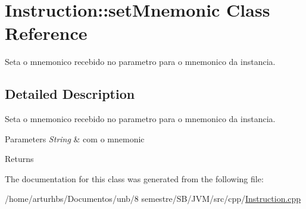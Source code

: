 \hypertarget{classInstruction_1_1setMnemonic}{}\section{Instruction\+:\+:set\+Mnemonic Class Reference}
\label{classInstruction_1_1setMnemonic}


Seta o mnemonico recebido no parametro para o mnemonico da instancia.  




\subsection{Detailed Description}
Seta o mnemonico recebido no parametro para o mnemonico da instancia. 


\begin{DoxyParams}{Parameters}
{\em String} & com o mnemonic \\
\hline
\end{DoxyParams}
\begin{DoxyReturn}{Returns}

\end{DoxyReturn}


The documentation for this class was generated from the following file\+:\begin{DoxyCompactItemize}
\item 
/home/arturhbs/\+Documentos/unb/8 semestre/\+S\+B/\+J\+V\+M/src/cpp/\hyperlink{Instruction_8cpp}{Instruction.\+cpp}\end{DoxyCompactItemize}
